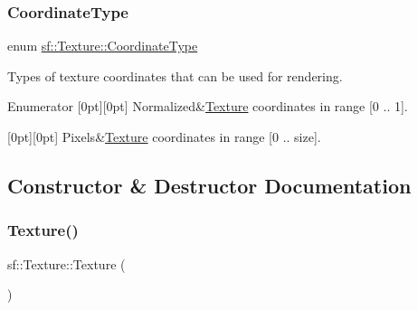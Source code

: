 \subsubsection{\texorpdfstring{Coordinate\+Type}{CoordinateType}}
{\footnotesize\ttfamily enum \hyperlink{classsf_1_1_texture_aa6fd3bbe3c334b3c4428edfb2765a82e}{sf\+::\+Texture\+::\+Coordinate\+Type}}



Types of texture coordinates that can be used for rendering. 

\begin{DoxyEnumFields}{Enumerator}
[0pt][0pt]{}\mbox{\label{classsf_1_1_texture_aa6fd3bbe3c334b3c4428edfb2765a82ea69d6228950882e4d68be4ba4dbe7df73}} 
Normalized&\hyperlink{classsf_1_1_texture}{Texture} coordinates in range \mbox{[}0 .. 1\mbox{]}. \\
\hline

[0pt][0pt]{}\mbox{\label{classsf_1_1_texture_aa6fd3bbe3c334b3c4428edfb2765a82ea6372f9c3a10203a7a69d8d5da59d82ff}} 
Pixels&\hyperlink{classsf_1_1_texture}{Texture} coordinates in range \mbox{[}0 .. size\mbox{]}. \\
\hline

\end{DoxyEnumFields}


\subsection{Constructor \& Destructor Documentation}
\mbox{\label{classsf_1_1_texture_a3e04674853b8533bf981db3173e3a4a7}} 
\subsubsection{\texorpdfstring{Texture()}{Texture()}\hspace{0.1cm}{\footnotesize\ttfamily [1/2]}}
{\footnotesize\ttfamily sf\+::\+Texture\+::\+Texture (\begin{DoxyParamCaption}{ }\end{DoxyParamCaption})}



